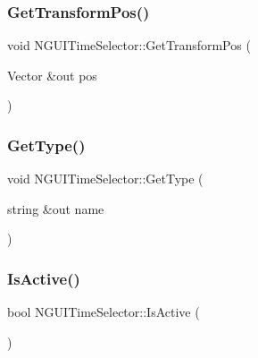\hypertarget{class_n_g_u_i_time_selector_ade551cb5ce5c7c54fab00fc6065e12c6}{}\label{class_n_g_u_i_time_selector_ade551cb5ce5c7c54fab00fc6065e12c6} 
\subsubsection{\texorpdfstring{Get\+Transform\+Pos()}{GetTransformPos()}}
{\footnotesize\ttfamily void N\+G\+U\+I\+Time\+Selector\+::\+Get\+Transform\+Pos (\begin{DoxyParamCaption}\item[{Vector \&out}]{pos }\end{DoxyParamCaption})}

\hypertarget{class_n_g_u_i_time_selector_a71ed7063aa6be5325676f715701c568e}{}\label{class_n_g_u_i_time_selector_a71ed7063aa6be5325676f715701c568e} 
\subsubsection{\texorpdfstring{Get\+Type()}{GetType()}}
{\footnotesize\ttfamily void N\+G\+U\+I\+Time\+Selector\+::\+Get\+Type (\begin{DoxyParamCaption}\item[{string \&out}]{name }\end{DoxyParamCaption})}

\hypertarget{class_n_g_u_i_time_selector_a1027ba613c683cd405594691d7b054c2}{}\label{class_n_g_u_i_time_selector_a1027ba613c683cd405594691d7b054c2} 
\subsubsection{\texorpdfstring{Is\+Active()}{IsActive()}}
{\footnotesize\ttfamily bool N\+G\+U\+I\+Time\+Selector\+::\+Is\+Active (\begin{DoxyParamCaption}{ }\end{DoxyParamCaption})}

\hypertarget{class_n_g_u_i_time_selector_ad39de562268e132a3f7ff3611a329183}{}\label{class_n_g_u_i_time_selector_ad39de562268e132a3f7ff3611a329183} 
